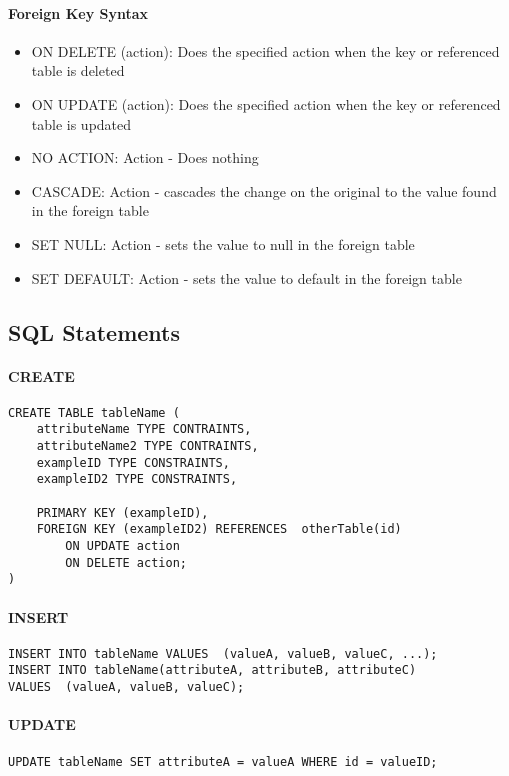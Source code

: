 \paragraph{Foreign Key Syntax}
\begin{itemize}
	\item ON DELETE (action): Does the specified action when the key or referenced table is deleted
	\item ON UPDATE (action): Does the specified action when the key or referenced table is updated
	\item NO ACTION: Action - Does nothing
	\item CASCADE: Action - cascades the change on the original to the value found in the foreign table
	\item SET NULL: Action - sets the value to null in the foreign table
	\item SET DEFAULT: Action - sets the value to default in the foreign table
\end{itemize}

\subsection{SQL Statements}
\paragraph{CREATE}
\begin{verbatim}
CREATE TABLE tableName (
	attributeName TYPE CONTRAINTS,
	attributeName2 TYPE CONTRAINTS,
	exampleID TYPE CONSTRAINTS,
	exampleID2 TYPE CONSTRAINTS,

	PRIMARY KEY (exampleID),
	FOREIGN KEY (exampleID2) REFERENCES  otherTable(id)
		ON UPDATE action
		ON DELETE action;
)
\end{verbatim}

\paragraph{INSERT}
\begin{verbatim}
INSERT INTO tableName VALUES  (valueA, valueB, valueC, ...);
INSERT INTO tableName(attributeA, attributeB, attributeC) 
VALUES  (valueA, valueB, valueC);
\end{verbatim}

\paragraph{UPDATE}
\begin{verbatim}
UPDATE tableName SET attributeA = valueA WHERE id = valueID;
\end{verbatim}

